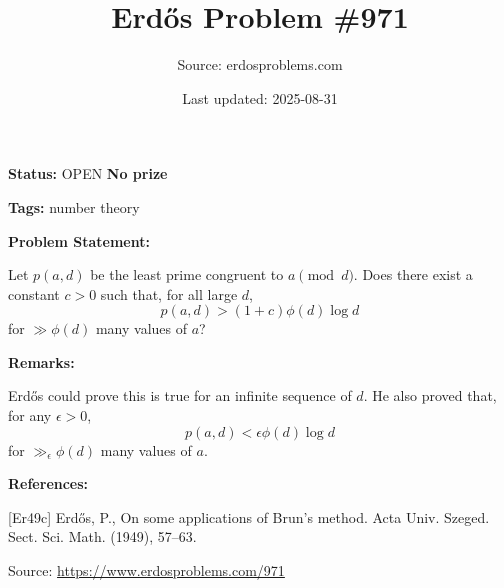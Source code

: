 \documentclass{article}
\title{Erd\H{o}s Problem \#971}
\date{Last updated: 2025-08-31}
\author{Source: erdosproblems.com}
\begin{document}
\maketitle

\noindent\textbf{Status:} OPEN \quad \textbf{No prize}

\noindent\textbf{Tags:} number theory

\medskip
\noindent\textbf{Problem Statement:}

Let $p(a,d)$ be the least prime congruent to $a\pmod{d}$. Does there exist a constant $c>0$ such that, for all large $d$,\[p(a,d) > (1+c)\phi(d)\log d\]for $\gg \phi(d)$ many values of $a$?

\bigskip
\noindent\textbf{Remarks:}

Erd\H{o}s \cite{Er49c} could prove this is true for an infinite sequence of $d$. He also proved that, for any $\epsilon>0$,\[p(a,d)< \epsilon \phi(d)\log d\]for $\gg_\epsilon \phi(d)$ many values of $a$.

\bigskip
\noindent\textbf{References:}

[Er49c] Erd\H{o}s, P., On some applications of {B}run's method. Acta Univ. Szeged. Sect. Sci. Math. (1949), 57--63.

\bigskip
\noindent\small{Source: \url{https://www.erdosproblems.com/971}}
\end{document}
